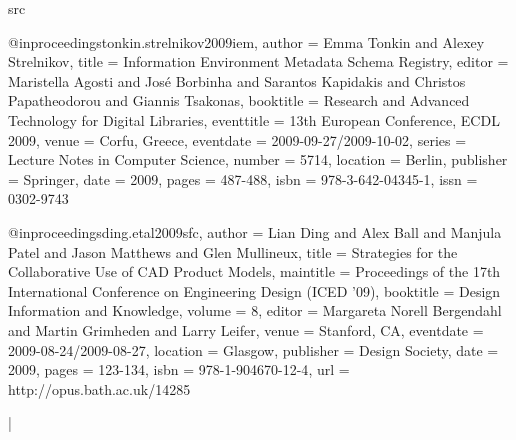 \documentclass[extrafontsizes,11pt,a4paper,oneside]{memoir}
\begin{document}
\begin{writeverbatim}{src}


@inproceedings{tonkin.strelnikov2009iem,
  author = {Emma Tonkin and Alexey Strelnikov},
  title = {Information Environment Metadata Schema Registry},
  editor = {Maristella Agosti and José Borbinha and Sarantos Kapidakis and Christos Papatheodorou and Giannis Tsakonas},
  booktitle = {Research and Advanced Technology for Digital Libraries},
  eventtitle = {13th European Conference, ECDL 2009},
  venue = {Corfu, Greece},
  eventdate = {2009-09-27/2009-10-02},
  series = {Lecture Notes in Computer Science},
  number = {5714},
  location = {Berlin},
  publisher = {Springer},
  date = {2009},
  pages = {487-488},
  isbn = {978-3-642-04345-1},
  issn = {0302-9743}
}

@inproceedings{ding.etal2009sfc,
  author = {Lian Ding and Alex Ball and Manjula Patel and Jason Matthews and Glen Mullineux},
  title = {Strategies for the Collaborative Use of CAD Product Models},
  maintitle = {Proceedings of the 17th International Conference on Engineering Design (ICED ’09)},
  booktitle = {Design Information and Knowledge},
  volume = {8},
  editor = {Margareta Norell Bergendahl and Martin Grimheden and Larry Leifer},
  venue = {Stanford, CA},
  eventdate = {2009-08-24/2009-08-27},
  location = {Glasgow},
  publisher = {Design Society},
  date = {2009},
  pages = {123-134},
  isbn = {978-1-904670-12-4},
  url = {http://opus.bath.ac.uk/14285}
}
\end{writeverbatim}


\todoc|
\printbibliography[notcategory=reviewed]
\end{document}

